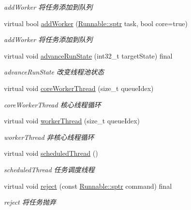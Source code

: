 \begin{DoxyCompactItemize}
\begin{DoxyCompactList}\small\item\em add\+Worker 将任务添加到队列 \end{DoxyCompactList}\item 
virtual bool \hyperlink{classThreadPoolExecutor_a9f108a305159ddf47923162f89a91a64}{add\+Worker} (\hyperlink{classRunnable_abe8d3066c7305401d6f0aad8e70780f2}{Runnable\+::sptr} task, bool core=true)
\begin{DoxyCompactList}\small\item\em add\+Worker 将任务添加到队列 \end{DoxyCompactList}\item 
virtual void \hyperlink{classThreadPoolExecutor_abaa3926310766a93b7fe1d83b77efdae}{advance\+Run\+State} (int32\+\_\+t target\+State) final
\begin{DoxyCompactList}\small\item\em advance\+Run\+State 改变线程池状态 \end{DoxyCompactList}\item 
virtual void \hyperlink{classThreadPoolExecutor_a5e40839bf4191b5eab9d81227ddb62c3}{core\+Worker\+Thread} (size\+\_\+t queue\+Idex)
\begin{DoxyCompactList}\small\item\em core\+Worker\+Thread 核心线程循环 \end{DoxyCompactList}\item 
virtual void \hyperlink{classThreadPoolExecutor_a844902ce61fb16b11a569b8ee56e80e9}{worker\+Thread} (size\+\_\+t queue\+Idex)
\begin{DoxyCompactList}\small\item\em worker\+Thread 非核心线程循环 \end{DoxyCompactList}\item 
\mbox{\label{classThreadPoolExecutor_a4c7ffb63829606ad4ae9fb247be42d3e}} 
virtual void \hyperlink{classThreadPoolExecutor_a4c7ffb63829606ad4ae9fb247be42d3e}{scheduled\+Thread} ()
\begin{DoxyCompactList}\small\item\em scheduled\+Thread 任务调度线程 \end{DoxyCompactList}\item 
virtual void \hyperlink{classThreadPoolExecutor_a353e65b77bb3c0950ed79939473d4852}{reject} (const \hyperlink{classRunnable_abe8d3066c7305401d6f0aad8e70780f2}{Runnable\+::sptr} command) final
\begin{DoxyCompactList}\small\item\em reject 将任务抛弃 \end{DoxyCompactList}\item 

\end{DoxyCompactItemize}
